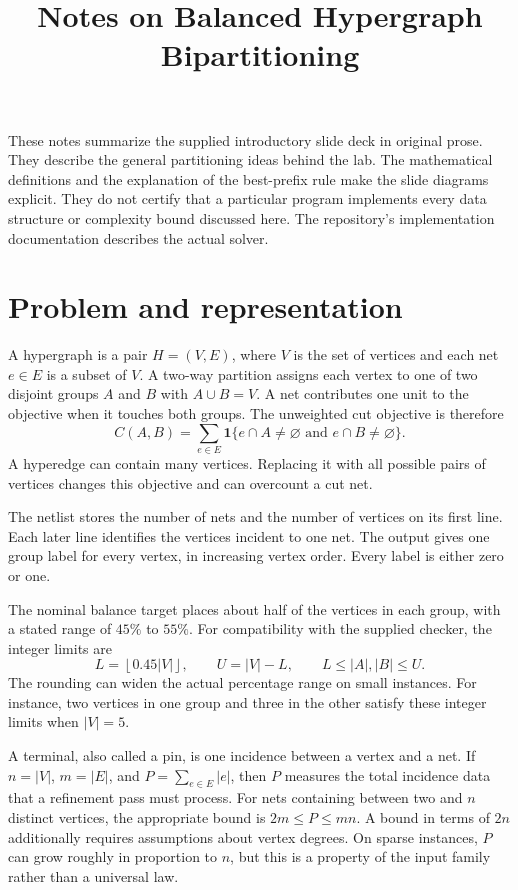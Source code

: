 \documentclass[11pt,a4paper]{article}
\title{Notes on Balanced Hypergraph Bipartitioning}
\author{}
\date{}
\begin{document}
\maketitle
\vspace{-2em}

These notes summarize the supplied introductory slide deck in original prose. They describe the general partitioning ideas behind the lab. The mathematical definitions and the explanation of the best-prefix rule make the slide diagrams explicit. They do not certify that a particular program implements every data structure or complexity bound discussed here. The repository's implementation documentation describes the actual solver.

\section{Problem and representation}

A hypergraph is a pair $H=(V,E)$, where $V$ is the set of vertices and each net $e\in E$ is a subset of $V$. A two-way partition assigns each vertex to one of two disjoint groups $A$ and $B$ with $A\cup B=V$. A net contributes one unit to the objective when it touches both groups. The unweighted cut objective is therefore
\[
 C(A,B)=\sum_{e\in E}\mathbf{1}\{e\cap A\ne\varnothing\text{ and }e\cap B\ne\varnothing\}.
\]
A hyperedge can contain many vertices. Replacing it with all possible pairs of vertices changes this objective and can overcount a cut net.

The netlist stores the number of nets and the number of vertices on its first line. Each later line identifies the vertices incident to one net. The output gives one group label for every vertex, in increasing vertex order. Every label is either zero or one.

The nominal balance target places about half of the vertices in each group, with a stated range of $45\%$ to $55\%$. For compatibility with the supplied checker, the integer limits are
\[
 L=\left\lfloor 0.45|V|\right\rfloor,
 \qquad U=|V|-L,
 \qquad L\le |A|,|B|\le U.
\]
The rounding can widen the actual percentage range on small instances. For instance, two vertices in one group and three in the other satisfy these integer limits when $|V|=5$.

A terminal, also called a pin, is one incidence between a vertex and a net. If $n=|V|$, $m=|E|$, and $P=\sum_{e\in E}|e|$, then $P$ measures the total incidence data that a refinement pass must process. For nets containing between two and $n$ distinct vertices, the appropriate bound is $2m\le P\le mn$. A bound in terms of $2n$ additionally requires assumptions about vertex degrees. On sparse instances, $P$ can grow roughly in proportion to $n$, but this is a property of the input family rather than a universal law.
\end{document}
